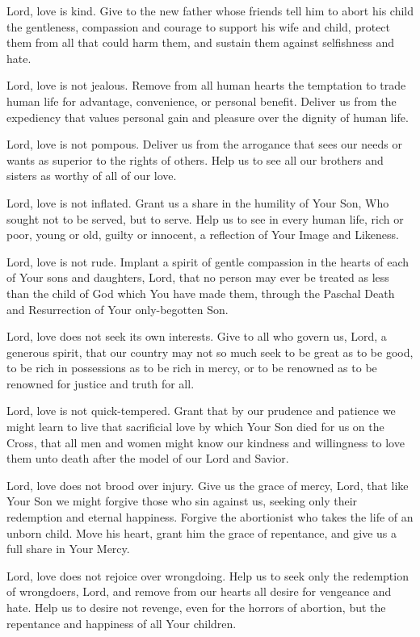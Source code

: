 \documentclass[12pt]{article}
\begin{document}
Lord, love is kind.
Give to the new father whose friends tell him to abort his child the gentleness, compassion and courage to support his wife and child, protect them from all that could harm them, and sustain them against selfishness and hate.

Lord, love is not jealous.
Remove from all human hearts the temptation to trade human life for advantage, convenience, or personal benefit.
Deliver us from the expediency that values personal gain and pleasure over the dignity of human life.

Lord, love is not pompous.
Deliver us from the arrogance that sees our needs or wants as superior to the rights of others.
Help us to see all our brothers and sisters as worthy of all of our love.

Lord, love is not inflated.
Grant us a share in the humility of Your Son, Who sought not to be served, but to serve. Help us to see in every human life, rich or poor, young or old, guilty or innocent, a reflection of Your Image and Likeness. 

Lord, love is not rude.
Implant a spirit of gentle compassion in the hearts of each of Your sons and daughters, Lord, that no person may ever be treated as less than the child of God which You have made them, through the Paschal Death and Resurrection of Your only-begotten Son.

Lord, love does not seek its own interests.
Give to all who govern us, Lord, a generous spirit, that our country may not so much seek to be great as to be good, to be rich in possessions as to be rich in mercy, or to be renowned as to be renowned for justice and truth for all.

Lord, love is not quick-tempered.
Grant that by our prudence and patience we might learn to live that sacrificial love by which Your Son died for us on the Cross, that all men and women might know our kindness and willingness to love them unto death after the model of our Lord and Savior.

Lord, love does not brood over injury.
Give us the grace of mercy, Lord, that like Your Son we might forgive those who sin against us, seeking only their redemption and eternal happiness.
Forgive the abortionist who takes the life of an unborn child.
Move his heart, grant him the grace of repentance, and give us a full share in Your Mercy.

Lord, love does not rejoice over wrongdoing.
Help us to seek only the redemption of wrongdoers, Lord, and remove from our hearts all desire for vengeance and hate.
Help us to desire not revenge, even for the horrors of abortion, but the repentance and happiness of all Your children.
\end{document}
